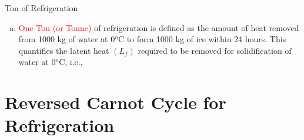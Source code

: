 \documentclass[10pt,compress]{beamer}
\newcommand{\red}{\textcolor{red}}
\begin{document}
\begin{frame}
{\begin{block}{\begin{center}\scriptsize Ton of Refrigeration\end{center}}
\begin{enumerate}[(a)]
           \item<4-> \red{One Ton (or Tonne)} of refrigeration is defined as the amount of heat removed from 1000 kg of water at 0$^{\text{o}}$C to form 1000 kg of ice within 24 hours. This quantifies the latent heat $\left(L_{f}\right)$ required to be removed for solidification of water at 0$^{\text{o}}$C, i.e.,
      \end{enumerate}
     \end{block}}
\end{frame}


\section{Reversed Carnot Cycle for Refrigeration}
\end{document}
